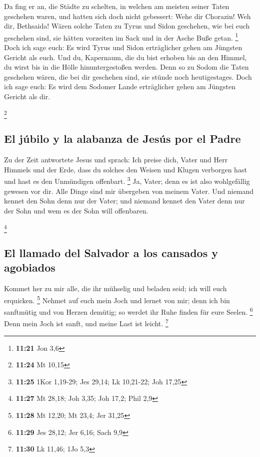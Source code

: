  Da fing er an, die Städte zu schelten, in welchen am
meisten seiner Taten geschehen waren, und hatten sich doch nicht
gebessert:  Wehe dir Chorazin! Weh dir, Bethsaida! Wären
solche Taten zu Tyrus und Sidon geschehen, wie bei euch geschehen sind,
sie hätten vorzeiten im Sack und in der Asche Buße getan. \footnote{\textbf{11:21}
  Jon 3,6}  Doch ich sage euch: Es wird Tyrus und Sidon
erträglicher gehen am Jüngsten Gericht als euch.  Und du,
Kapernaum, die du bist erhoben bis an den Himmel, du wirst bis in die
Hölle hinuntergestoßen werden. Denn so zu Sodom die Taten geschehen
wären, die bei dir geschehen sind, sie stünde noch heutigestages.
 Doch ich sage euch: Es wird dem Sodomer Lande
erträglicher gehen am Jüngsten Gericht als dir.

\footnote{\textbf{11:24} Mt 10,15}

\hypertarget{el-juxfabilo-y-la-alabanza-de-jesuxfas-por-el-padre}{%
\subsection{El júbilo y la alabanza de Jesús por el
Padre}\label{el-juxfabilo-y-la-alabanza-de-jesuxfas-por-el-padre}}

 Zu der Zeit antwortete Jesus und sprach: Ich preise
dich, Vater und Herr Himmels und der Erde, dass du solches den Weisen
und Klugen verborgen hast und hast es den Unmündigen offenbart.
\footnote{\textbf{11:25} 1Kor 1,19-29; Jes 29,14; Lk 10,21-22; Joh 17,25}
 Ja, Vater; denn es ist also wohlgefällig gewesen vor
dir.  Alle Dinge sind mir übergeben von meinem Vater. Und
niemand kennet den Sohn denn nur der Vater; und niemand kennet den Vater
denn nur der Sohn und wem es der Sohn will offenbaren.

\footnote{\textbf{11:27} Mt 28,18; Joh 3,35; Joh 17,2; Phil 2,9}

\hypertarget{el-llamado-del-salvador-a-los-cansados-y-agobiados}{%
\subsection{El llamado del Salvador a los cansados
\hspace{0pt}\hspace{0pt}y
agobiados}\label{el-llamado-del-salvador-a-los-cansados-y-agobiados}}

 Kommet her zu mir alle, die ihr mühselig und beladen
seid; ich will euch erquicken. \footnote{\textbf{11:28} Mt 12,20; Mt
  23,4; Jer 31,25}  Nehmet auf euch mein Joch und lernet
von mir; denn ich bin sanftmütig und von Herzen demütig; so werdet ihr
Ruhe finden für eure Seelen. \footnote{\textbf{11:29} Jes 28,12; Jer
  6,16; Sach 9,9}  Denn mein Joch ist sanft, und meine
Last ist leicht. \footnote{\textbf{11:30} Lk 11,46; 1Jo 5,3}

